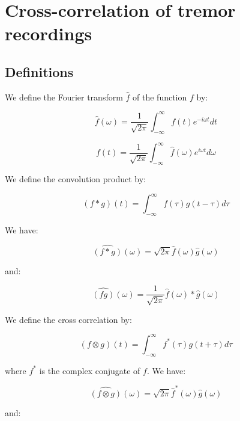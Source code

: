 \documentclass[workdone.tex]{subfiles}
\begin{document}
\section{Cross-correlation of tremor recordings}

\subsection{Definitions}

We define the Fourier transform $\hat{f}$ of the function $f$ by:

\begin{equation}
\hat{f} (\omega) = \frac{1}{\sqrt{2 \pi}} \int_{- \infty}^{\infty} f(t) e^{-i \omega t} dt
\end{equation}

\begin{equation}
f(t) = \frac{1}{\sqrt{2 \pi}} \int_{- \infty}^{\infty} \hat{f} (\omega) e^{i \omega t} d\omega
\end{equation}

We define the convolution product by:

\begin{equation}
(f * g) (t) = \int_{-\infty}^{\infty} f(\tau) g(t - \tau) d\tau
\end{equation}

We have:

\begin{equation}
\hat{(f * g)} (\omega) = \sqrt{2 \pi} \hat{f} (\omega) \hat{g} (\omega)
\end{equation}

and:

\begin{equation}
\hat{(f g)} (\omega) = \frac{1}{\sqrt{2 \pi}} \hat{f} (\omega) * \hat{g} (\omega)
\end{equation}

We define the cross correlation by:

\begin{equation}
(f \otimes g) (t) = \int_{- \infty}^{\infty} f^* (\tau) g(t + \tau) d\tau
\end{equation}

where $f^*$ is the complex conjugate of $f$. We have:

\begin{equation}
\hat{(f \otimes g)} (\omega) = \sqrt{2 \pi} \hat{f}^* (\omega) \hat{g} (\omega)
\end{equation}
 
 and:
\end{document}
